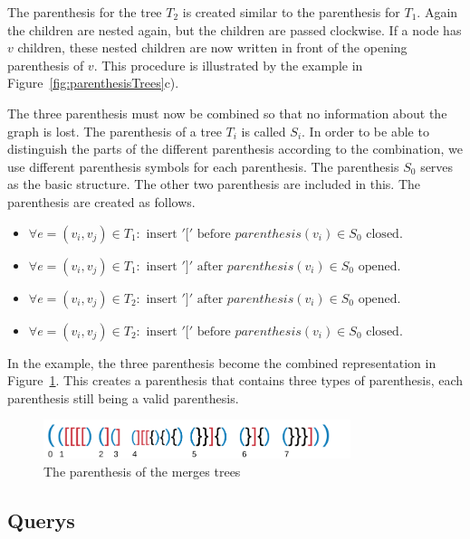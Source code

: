\documentclass[a4paper]{scrartcl}
\begin{document}
The parenthesis for the tree $T_2$ is created similar to the parenthesis for $T_1$. Again the children are nested again, but the children are passed clockwise. If a node has $v$ children, these nested children are now written in front of the opening parenthesis of $v$. This procedure is illustrated by the example in Figure~\ref{fig:parenthesisTrees}c).




The three parenthesis must now be combined so that no information about the graph is lost. The parenthesis of a tree $T_i$ is called $S_i$. In order to be able to distinguish the parts of the different parenthesis according to the combination, we use different parenthesis symbols for each parenthesis. The parenthesis $S_0$ serves as the basic structure. The other two parenthesis are included in this. The parenthesis are created as follows.

\begin{itemize}
	\item $\forall e=(v_i,v_j)\in T_1: \text{ insert } '[' \text{ before } parenthesis(v_i)\in S_0 \text{ closed.}$
	\item $\forall e=(v_i,v_j)\in T_1: \text{ insert } ']' \text{ after } parenthesis(v_i)\in S_0 \text{ opened.}$
	\item $\forall e=(v_i,v_j)\in T_2: \text{ insert } ']' \text{ after } parenthesis(v_i)\in S_0 \text{ opened.}$
	\item $\forall e=(v_i,v_j)\in T_2: \text{ insert } '[' \text{ before } parenthesis(v_i)\in S_0 \text{ closed.}$
\end{itemize}
In the example, the three parenthesis become the combined representation in Figure~\ref{fig:parenthesisCombi}.
This creates a parenthesis that contains three types of parenthesis, each parenthesis still being a valid parenthesis.

\begin{figure}[h]
	\centering
	\includegraphics[width=0.8\textwidth]{img/parenthesisCombi}
	\caption{The parenthesis of the merges trees}
	\label{fig:parenthesisCombi}
\end{figure}

\subsection{Querys}
\end{document}
